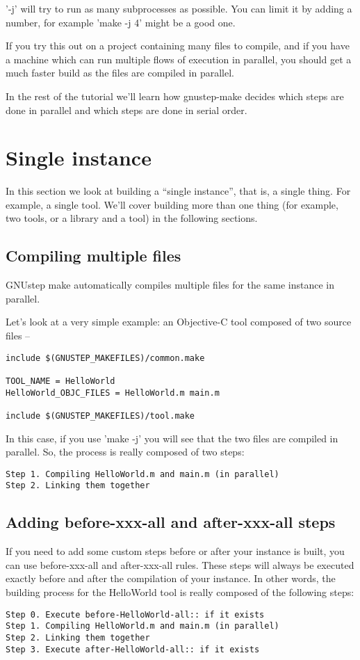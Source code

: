 \documentclass[a4paper]{article}
\begin{document}
'-j' will try to run as many subprocesses as possible.  You can limit
it by adding a number, for example 'make -j 4' might be a good one.

If you try this out on a project containing many files to compile, and
if you have a machine which can run multiple flows of execution in
parallel, you should get a much faster build as the files are compiled
in parallel.

In the rest of the tutorial we'll learn how gnustep-make decides which
steps are done in parallel and which steps are done in serial order.

\section{Single instance}
In this section we look at building a ``single instance'', that is, a
single thing.  For example, a single tool.  We'll cover building more
than one thing (for example, two tools, or a library and a tool) in
the following sections.

\subsection{Compiling multiple files}
GNUstep make automatically compiles multiple files for the same
instance in parallel.

Let's look at a very simple example: an Objective-C tool composed of
two source files --

\begin{verbatim}
include $(GNUSTEP_MAKEFILES)/common.make

TOOL_NAME = HelloWorld
HelloWorld_OBJC_FILES = HelloWorld.m main.m

include $(GNUSTEP_MAKEFILES)/tool.make
\end{verbatim}

In this case, if you use 'make -j' you will see that the two files are
compiled in parallel.  So, the process is really composed of two
steps:

\begin{verbatim}
Step 1. Compiling HelloWorld.m and main.m (in parallel)
Step 2. Linking them together
\end{verbatim}

\subsection{Adding before-xxx-all and after-xxx-all steps}
If you need to add some custom steps before or after your instance is
built, you can use before-xxx-all and after-xxx-all rules.  These
steps will always be executed exactly before and after the compilation
of your instance.  In other words, the building process for the
HelloWorld tool is really composed of the following steps:
\begin{verbatim}
Step 0. Execute before-HelloWorld-all:: if it exists
Step 1. Compiling HelloWorld.m and main.m (in parallel)
Step 2. Linking them together
Step 3. Execute after-HelloWorld-all:: if it exists
\end{verbatim}
\end{document}
